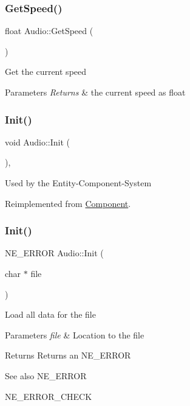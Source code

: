 \subsubsection{\texorpdfstring{GetSpeed()}{GetSpeed()}}
{\footnotesize\ttfamily float Audio\+::\+Get\+Speed (\begin{DoxyParamCaption}{ }\end{DoxyParamCaption})}

Get the current speed 
\begin{DoxyParams}{Parameters}
{\em Returns} & the current speed as float \\
\hline
\end{DoxyParams}
\mbox{\label{class_audio_aec12bdecd60ff3fdeebebfb823902ff9}} 
\subsubsection{\texorpdfstring{Init()}{Init()}\hspace{0.1cm}{\footnotesize\ttfamily [1/2]}}
{\footnotesize\ttfamily void Audio\+::\+Init (\begin{DoxyParamCaption}{ }\end{DoxyParamCaption})\hspace{0.3cm}{\ttfamily [override]}, {\ttfamily [virtual]}}

Used by the Entity-\/\+Component-\/\+System 

Reimplemented from \mbox{\hyperlink{class_component}{Component}}.

\mbox{\label{class_audio_a8d7e94a82e16646a1b74535834d751b9}} 
\subsubsection{\texorpdfstring{Init()}{Init()}\hspace{0.1cm}{\footnotesize\ttfamily [2/2]}}
{\footnotesize\ttfamily N\+E\+\_\+\+E\+R\+R\+OR Audio\+::\+Init (\begin{DoxyParamCaption}\item[{char $\ast$}]{file }\end{DoxyParamCaption})}

Load all data for the file 
\begin{DoxyParams}{Parameters}
{\em file} & Location to the file \\
\hline
\end{DoxyParams}
\begin{DoxyReturn}{Returns}
Returns an N\+E\+\_\+\+E\+R\+R\+OR 
\end{DoxyReturn}
\begin{DoxySeeAlso}{See also}
N\+E\+\_\+\+E\+R\+R\+OR 

N\+E\+\_\+\+E\+R\+R\+O\+R\+\_\+\+C\+H\+E\+CK 
\end{DoxySeeAlso}
\mbox{\label{class_audio_a2f173c788f4c72def6cd0d5d52cb83a4}} 

